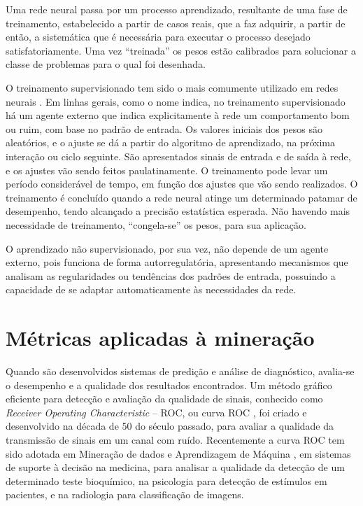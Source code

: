 Uma rede neural passa por um processo aprendizado, resultante de uma fase de treinamento, estabelecido a partir de casos reais, que a faz adquirir, a partir de então, a sistemática que é necessária para executar o processo desejado satisfatoriamente. 
Uma vez ``treinada'' os pesos estão calibrados para solucionar a classe de problemas para o qual foi desenhada. 


O treinamento supervisionado tem sido o mais comumente utilizado em redes neurais \cite{Barreto2002}. 
Em linhas gerais, como o nome indica, no treinamento supervisionado há um agente externo que indica explicitamente à rede um 
comportamento bom ou ruim, com base no padrão de entrada. Os valores iniciais dos pesos são aleatórios, e o ajuste se dá a partir do 
algoritmo de aprendizado, na próxima interação ou ciclo seguinte. São apresentados sinais de entrada e de saída à rede, e os ajustes 
vão sendo feitos paulatinamente. O treinamento pode levar um período considerável de tempo, em função dos ajustes que vão sendo 
realizados. O treinamento é concluído quando a rede neural atinge um determinado patamar de desempenho, tendo alcançado a precisão 
estatística esperada. 
Não havendo mais necessidade de treinamento, “congela-se” os pesos, para sua aplicação. 

O aprendizado não supervisionado, por sua vez, não depende de um agente externo, pois funciona de forma autorregulatória, apresentando 
mecanismos que analisam as regularidades ou tendências dos padrões de entrada, possuindo a capacidade de se adaptar automaticamente às 
necessidades da rede. 


\section{Métricas aplicadas à mineração}

Quando são desenvolvidos sistemas de predição e análise de diagnóstico, avalia-se o desempenho e a qualidade dos resultados encontrados.
Um método gráfico eficiente para detecção e avaliação da qualidade de sinais, conhecido como \textit{Receiver Operating Characteristic} -- ROC, ou curva ROC \cite{ROC},
foi criado e desenvolvido na década de 50 do século passado, para avaliar a qualidade da transmissão de sinais em um canal com ruído.
Recentemente a curva ROC tem sido adotada em Mineração de dados e Aprendizagem de Máquina \cite{MD_AM}, em sistemas de suporte à decisão na medicina, para analisar a qualidade da detecção 
de um determinado teste bioquímico, na psicologia para detecção de estímulos \cite{Discriminativo} em pacientes, e na radiologia para classificação de imagens.

